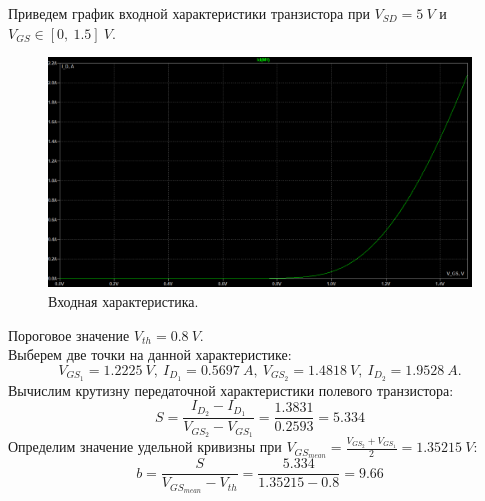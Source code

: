 \documentclass[12pt]{article}
\begin{document}
Приведем график входной характеристики транзистора при $V_{SD} = 5 \ V$ и $V_{GS} \in [0, \ 1.5] \ V.$
\begin{figure}[H]
    \centering
    \includegraphics[width=\textwidth]{1_input_char.png}
    \caption{Входная характеристика.}
    \label{fig:1_input_char}
\end{figure}
Пороговое значение $V_{th} = 0.8 \ V$.\\
Выберем две точки на данной характеристике:
\[
    V_{GS_1} = 1.2225 \ V, \ I_{D_1} = 0.5697 \ A, \ V_{GS_2} = 1.4818 \ V, \ I_{D_2} = 1.9528 \ A.
\]
Вычислим крутизну передаточной характеристики полевого транзистора:
\[
    S = \frac{I_{D_2} - I_{D_1}}{V_{GS_2} - V_{GS_1}} = \frac{1.3831}{0.2593} = 5.334
\]
Определим значение удельной кривизны при $V_{GS_{mean}} = \frac{V_{GS_2} + V_{GS_1}}{2} = 1.35215 \ V$:
\[
    b = \frac{S}{V_{GS_{mean}} - V_{th}} = \frac{5.334}{1.35215 - 0.8} = 9.66
\]
\end{document}
